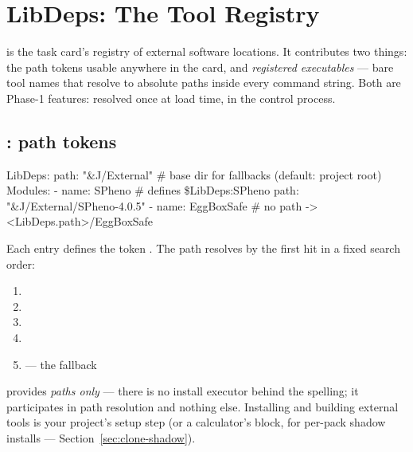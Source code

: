 \chapter{LibDeps: The Tool Registry}
\label{ch:libdeps}

  is the task
card's registry of external software locations. It contributes two things: the
 path tokens usable anywhere in the card, and
\emph{registered executables} --- bare tool names that resolve to absolute paths inside
every command string. Both are Phase-1 features: resolved once at load time, in the
control process.

\section{: path tokens}
\label{sec:libdeps-modules}

\begin{yamlwin}
LibDeps:
  path: "&J/External"           # base dir for fallbacks (default: project root)
  Modules:
    - name: SPheno              # defines \${LibDeps:SPheno}
      path: "&J/External/SPheno-4.0.5"
    - name: EggBoxSafe          # no path -> <LibDeps.path>/EggBoxSafe
\end{yamlwin}

Each entry defines the token . The path resolves by the first
hit in a fixed search order:

\begin{enumerate}
  \item {}
  \item {}
  \item {}
  \item {}
  \item {} --- the fallback
\end{enumerate}

\begin{jnote}
 provides \emph{paths only} --- there is no install executor behind the
 spelling; it participates in path resolution and nothing else.
Installing and building external tools is your project's setup step (or a calculator's
 block, for per-pack shadow installs ---
Section~\ref{sec:clone-shadow}).
\end{jnote}

